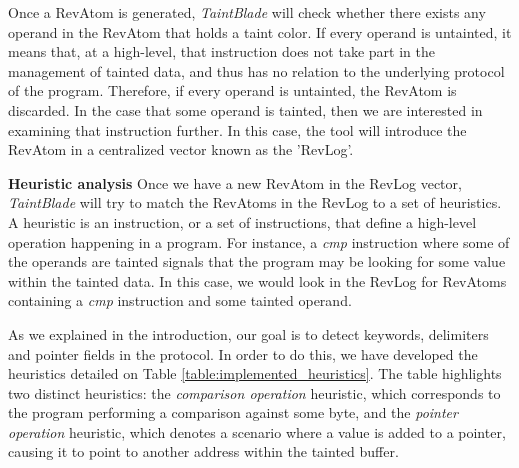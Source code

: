 \documentclass[conference]{IEEEtran}
\begin{document}
Once a RevAtom is generated, \textit{TaintBlade} will check whether there
exists any operand in the RevAtom that holds a taint color. If every operand is
untainted, it means that, at a high-level, that instruction does not take part
in the management of tainted data, and thus has no relation to the underlying
protocol of the program. Therefore, if every operand is untainted, the RevAtom
is discarded. In the case that some operand is tainted, then we are interested
in examining that instruction further. In this case, the tool will introduce
the RevAtom in a centralized vector known as the 'RevLog'.

\textbf{Heuristic analysis}
Once we have a new RevAtom in the RevLog vector, \textit{TaintBlade} will try to match the RevAtoms in the RevLog
to a set of heuristics. A heuristic is an instruction, or a set of instructions, that define a high-level
operation happening in a program. For instance, a \textit{cmp} instruction where some of the operands
are tainted signals that the program may be looking for some value within the tainted data. In this case, we would look in the RevLog for RevAtoms
containing a \textit{cmp} instruction and some tainted operand.

As we explained in the introduction, our goal is to detect keywords, delimiters
and pointer fields in the protocol. In order to do this, we have developed the 
heuristics detailed on
Table \ref{table:implemented_heuristics}. The table highlights two distinct heuristics:
the \textit{comparison operation} heuristic, which
corresponds to the program performing a comparison against some byte, and the
\textit{pointer operation} heuristic, which denotes a scenario where a value is added to a pointer, 
causing it to point to another address within the tainted buffer.
\end{document}
